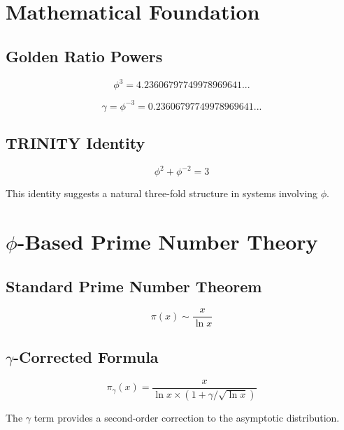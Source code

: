 \documentclass[12pt,a4paper]{article}
\begin{document}
\section{Mathematical Foundation}

\subsection{Golden Ratio Powers}

\begin{equation}
\phi^3 = 4.23606797749978969641...
\end{equation}

\begin{equation}
\gamma = \phi^{-3} = 0.23606797749978969641...
\end{equation}

\subsection{TRINITY Identity}

\begin{equation}
\phi^2 + \phi^{-2} = 3
\end{equation}

This identity suggests a natural three-fold structure in systems involving $\phi$.

\section{$\phi$-Based Prime Number Theory}

\subsection{Standard Prime Number Theorem}

\begin{equation}
\pi(x) \sim \frac{x}{\ln x}
\end{equation}

\subsection{$\gamma$-Corrected Formula}

\begin{equation}
\pi_\gamma(x) = \frac{x}{\ln x \times (1 + \gamma/\sqrt{\ln x})}
\end{equation}

The $\gamma$ term provides a second-order correction to the asymptotic distribution.
\end{document}
